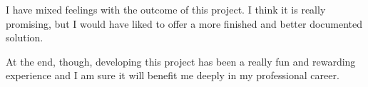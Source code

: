 \documentclass[a4paper,11pt,titlepage,abstract,numbers=noenddot,automark,mnsy,intlimits,rgb,dvipsnames]{report}
\begin{document}
I have mixed feelings with the outcome of this project. I think it is really promising, but I would have liked to
offer a more finished and better documented solution.

At the end, though, developing this project has been a really fun and rewarding experience and I am sure it will
benefit me deeply in my professional career.


\end{document}
